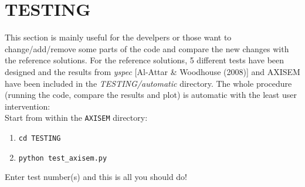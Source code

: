 \documentclass[11pt,letter,fleqn,english,notitlepage]{article}
\begin{document}




\newpage
\section{TESTING}

This section is mainly useful for the develpers or those want to change/add/remove some parts of the code and compare the new changes with the reference solutions.
For the reference solutions, 5 different tests have been designed and
the results from \textit{yspec} [Al-Attar \& Woodhouse (2008)] and AXISEM have been included in the \textit{TESTING/automatic} directory.
The whole procedure (running the code, compare the results and plot) is automatic with the least user intervention: \\

Start from within the {\tt AXISEM} directory:
 \begin{enumerate}
 \itemsep0em
 \item {\tt cd TESTING}
 \item {\tt python test\_axisem.py}
 \end{enumerate}

Enter test number(s) and this is all you should do! \\
\end{document}
